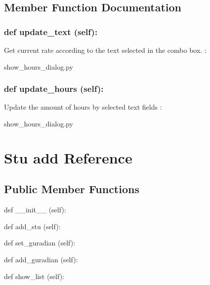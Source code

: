 \subsection{Member Function Documentation}
\hypertarget{class_poly_a14a7ad77ce612b0c54f531d307ee4b39}{
\subsubsection[{def update_text (self):}]{\setlength{\rightskip}{0pt plus 5cm}def {update\_text} (self):}}\label{class_poly_a14a7ad77ce612b0c54f531d307ee4b39}
Get current rate according to the text selected in the combo box.
:\begin{DoxyCompactItemize}
\item 
show\_hours\_dialog.\-py\end{DoxyCompactItemize}

\hypertarget{class_poly_a14a7ad77ce612b0c54f531d307ee4b39}{
\subsubsection[{def update_hours (self):}]{\setlength{\rightskip}{0pt plus 5cm}def {update\_hours} (self):}}\label{class_poly_a14a7ad77ce612b0c54f531d307ee4b39}
Update the amount of hours by selected text fields
:\begin{DoxyCompactItemize}
\item 
show\_hours\_dialog.\-py\end{DoxyCompactItemize}


\hypertarget{Stu_add}{\section{Stu add Reference}
\label{Stu_add}
}
\subsection*{Public Member Functions}
\begin{DoxyCompactItemize}
\item 
def {\_\_init\_\_} (self):
\item 
def {add\_stu} (self):
\item 
def {set\_guradian} (self):
\item 
def {add\_guradian} (self):
\item 
def {show\_list} (self):
\end{DoxyCompactItemize}

